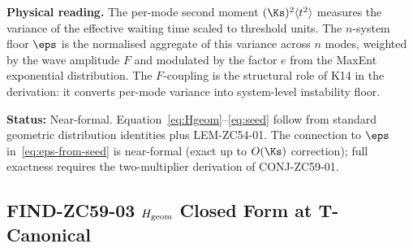 \documentclass[12pt, a4paper]{article}
\begin{document}
\begin{formalbox}[title={LEM-ZC59-01: Single-Mode MaxEnt Seed
  Equation from $n$-Simplex ($R_0$)}]
\textbf{Physical reading.}
The per-mode second moment $(\Ks)^2\langle t^2\rangle$ measures
the variance of the effective waiting time scaled to threshold
units.  The $n$-system floor $\eps$ is the normalised aggregate
of this variance across $n$ modes, weighted by the wave amplitude
$F$ and modulated by the factor $e$ from the MaxEnt exponential
distribution.  The $F$-coupling is the structural role of K14 in
the derivation: it converts per-mode variance into system-level
instability floor.

\textbf{Status:} Near-formal.
Equation~\eqref{eq:Hgeom}--\eqref{eq:seed} follow from standard
geometric distribution identities plus LEM-ZC54-01.  The
connection to $\eps$ in~\eqref{eq:eps-from-seed} is
near-formal (exact up to $O(\Ks)$ correction); full exactness
requires the two-multiplier derivation of CONJ-ZC59-01.
\end{formalbox}

\subsection{FIND-ZC59-03 \quad $H_{\rm geom}$ Closed Form at T-Canonical}
\label{sec:find03}

\end{document}
